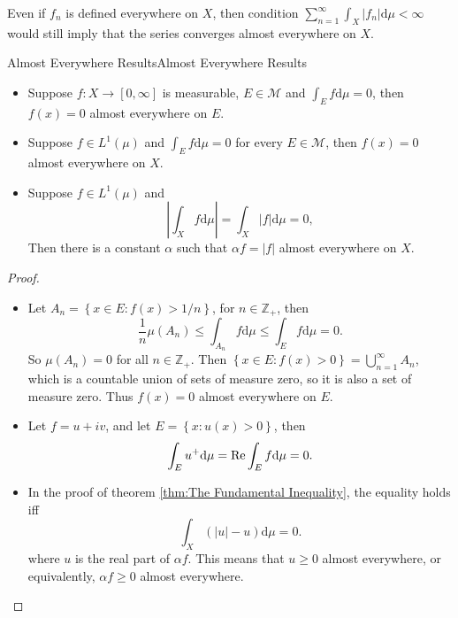 \documentclass[../main.tex]{subfiles}
\begin{document}
\begin{remark}
	Even if $f_n$ is defined everywhere on $X$, then condition $\displaystyle \sum_{n=1}^{\infty} \int_X \left|f_n\right| \mathrm{d} \mu < \infty$ would still imply that the series converges almost everywhere on $X$.
\end{remark}

\begin{proposition}{Almost Everywhere Results}{Almost Everywhere Results}
\begin{itemize}
	\item Suppose $f:X \rightarrow [0,\infty ]$ is measurable, $E\in \mathcal{M}$ and $\displaystyle \int_E f \mathrm{d} \mu=0$, then $f(x)=0$ almost everywhere on $E$.
	\item Suppose $f\in L^1(\mu)$ and $\displaystyle \int_E f \mathrm{d} \mu = 0$ for every $E\in \mathcal{M}$, then $f(x)=0$ almost everywhere on $X$.
	\item Suppose $f\in L^1(\mu)$ and
		\begin{equation*}
			\left|\int_X f \mathrm{d} \mu\right| = \int_X \left|f\right| \mathrm{d} \mu = 0,
		\end{equation*}
		Then there is a constant $\alpha$ such that $\alpha f = \left|f\right|$ almost everywhere on $X$.
\end{itemize}
\end{proposition}
\begin{proof}
\begin{itemize}
\item Let $A_n = \left\{ x\in E: f(x) >  1 / n\right\}$, for $n\in \mathbb{Z}_+$, then
	\begin{equation*}
		\frac{1}{n}\mu(A_n) \leq \int_{A_n} f \mathrm{d} \mu \leq \int_E f \mathrm{d} \mu = 0.
	\end{equation*}
	So $\mu(A_n)=0$ for all $n\in \mathbb{Z}_+$. Then $\left\{ x\in E: f(x)>0 \right\} = \bigcup_{n=1}^{\infty } A_n$, which is a countable union of sets of measure zero, so it is also a set of measure zero. Thus $f(x)=0$ almost everywhere on $E$.
\item Let $f=u+iv$, and let $E = \left\{ x: u(x)>0 \right\}$, then
	\begin{equation*}
		\int_E u^+ \mathrm{d} \mu = \operatorname{Re} \int_E f \mathrm{d} \mu = 0.
	\end{equation*}
\item In the proof of theorem \ref{thm:The Fundamental Inequality}, the equality holds iff
	\begin{equation*}
		\int_X (\left|u\right|-u) \mathrm{d} \mu = 0.
	\end{equation*}
	where $u$ is the real part of $\alpha f$. This means that $u\geq 0$ almost everywhere, or equivalently, $\alpha f \geq 0$ almost everywhere.
\end{itemize}
\end{proof}
\end{document}
